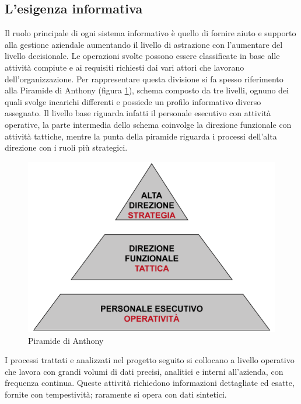 \subsection{L'esigenza informativa}
\label{sec:anthony}
Il ruolo principale di ogni sistema informativo è quello di fornire aiuto e supporto alla gestione aziendale aumentando il livello di astrazione con l'aumentare del livello decisionale.
Le operazioni svolte possono essere classificate in base alle attività compiute e ai requisiti richiesti dai vari attori che lavorano dell'organizzazione. Per rappresentare questa divisione si fa spesso riferimento alla Piramide di Anthony \cite{anthony}\cite{anthony2} (figura \ref{fig:anthony}), schema composto da tre livelli, ognuno dei quali svolge incarichi differenti e possiede un profilo informativo diverso assegnato. Il livello base riguarda infatti il personale esecutivo con attività operative, la parte intermedia dello schema coinvolge la direzione funzionale con attività tattiche, mentre la punta della piramide riguarda i processi dell'alta direzione con i ruoli più strategici.
\begin{figure}[!hbt]
\centering
\includegraphics[scale=0.45]{img/anthony_scheme.png}
\caption{Piramide di Anthony}
\label{fig:anthony}
\end{figure}
\newline
\noindent
I processi trattati e analizzati nel progetto seguito si collocano a livello operativo che lavora con grandi volumi di dati precisi, analitici e interni all'azienda, con frequenza continua. Queste attività richiedono informazioni dettagliate ed esatte, fornite con tempestività; raramente si opera con dati sintetici. \\

